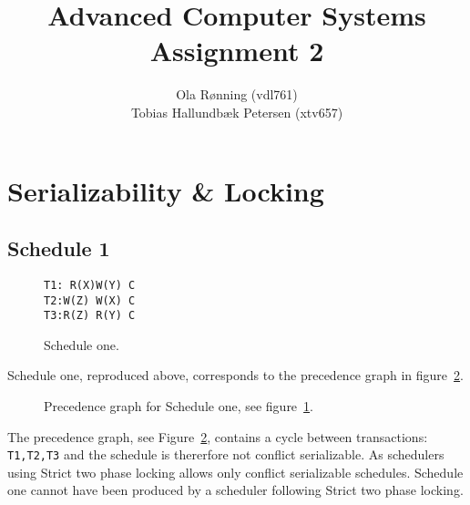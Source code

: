 \documentclass[a4paper]{article}
\author{Ola Rønning (vdl761) \\ Tobias Hallundbæk Petersen (xtv657)}
\title{Advanced Computer Systems \\ Assignment 2}
\begin{document}
\maketitle
\section{Serializability \& Locking}

\subsection*{Schedule 1}
\begin{figure}[h!]
\texttt{T1: R(X)\hspace{250pt}W(Y) C\\
T2:\hspace{50pt}W(Z) W(X) C \\
T3:\hspace{150pt}R(Z) R(Y) C}
\caption{Schedule one.}
\label{sch1}
\end{figure}
Schedule one, reproduced above, corresponds to the precedence graph in figure~\ref{p1}.
\begin{figure}[h!]
\centering
{}
\caption{Precedence graph for Schedule one, see figure~\ref{sch1}.}
\label{p1}
\end{figure}
The precedence graph, see Figure~\ref{p1}, contains a cycle between transactions: \texttt{T1,T2,T3} and the schedule is thererfore not conflict serializable. As schedulers using Strict two phase locking allows only conflict serializable schedules. Schedule one cannot have been produced by a scheduler following Strict two phase locking.
\end{document}
